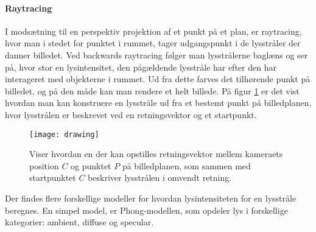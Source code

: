 \paragraph{Raytracing}
I modsætning til en perspektiv projektion af et punkt på et plan, er raytracing, hvor man i stedet for punktet i rummet, tager udgangspunkt i de lysstråler der danner billedet. Ved backwards raytracing følger man lysstrålerne baglæns og ser på, hvor stor en lysintensitet, den pågældende lysstråle har efter den har interageret med objekterne i rummet. Ud fra dette farves det tilhørende punkt på billedet, og på den måde kan man rendere et helt billede. På figur \ref{fig:raytracing_skitse} er det vist hvordan man kan konstruere en lysstråle ud fra et bestemt punkt på billedplanen, hvor lysstrålen er beskrevet ved en retningsvektor og et startpunkt.

\begin{figure}[H]
  \label{fig:raytracing_skitse}
  \centering
  \texttt{[image: drawing]}
  \caption{Viser hvordan en der kan opstilles retningsvektor mellem kameraets position $C$ og punktet $P$ på billedplanen, som sammen med startpunktet $C$ beskriver lysstrålen i omvendt retning.}
\end{figure}

Der findes flere forskellige modeller for hvordan lysintensiteten for en lysstråle beregnes. En simpel model, er Phong-modellen, som opdeler lys i forskellige kategorier: ambient, diffuse og specular.









